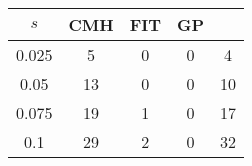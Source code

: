 \centering \begin{tabular}{c|c|c|c|c}
$s$	&CMH	&FIT	&GP	&\sc{Clear}\\\hline
0.025	&5	&0	&0	&4\\
0.05	&13	&0	&0	&10\\
0.075	&19	&1	&0	&17\\
0.1	&29	&2	&0	&32\\
\end{tabular}
